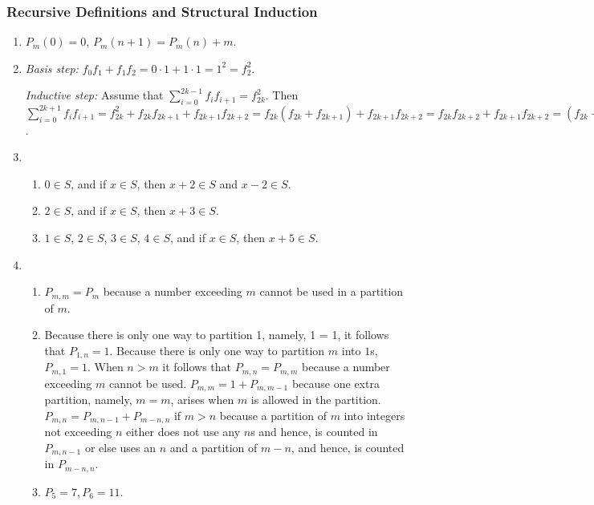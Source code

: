 \documentclass{../../cls/sig-alternate-05-2015}
\begin{document}
\subsubsection{Recursive Definitions and Structural Induction}
\begin{enumerate}
\item $P_m(0) = 0$, $P_m(n + 1) = P_m(n) + m$.
    
    
\item \textit{Basis step:} $f_0 f_1 + f_1 f_2 = 0 \cdot 1 + 1 \cdot 1 = 1^2 = f_2^2$.

\textit{Inductive step:} Assume that $\sum_{i = 0}^{2k - 1} f_i f_{i + 1} = f_{2k}^2$.
Then $\sum_{i = 0}^{2k + 1} f_i f_{i + 1} = f_{2k}^2 + f_{2k} f_{2k + 1} + f_{2k + 1} f_{2k + 2} = f_{2k} (f_{2k} + f_{2k + 1}) + f_{2k + 1} f_{2k + 2} = f_{2k} f_{2k + 2} + f_{2k + 1} f_{2k + 2} = (f_{2k} + f_{2k + 1}) f_{2k + 2} = f_{2k + 2}^2$.


\item
\begin{enumerate}
    \item $0 \in S$, and if $x \in S$, then $x + 2 \in S$
    and $x - 2 \in S$. 
    \item $2 \in S$, and if $x \in S$, then $x + 3 \in S$.
    \item $1 \in S$, $2 \in S$, $3 \in S$, $4 \in S$, and if $x \in S$, then $x + 5 \in S$.
\end{enumerate}


\item \begin{enumerate}
    \item $P_{m, m} = P_m$ because a number exceeding $m$ cannot be used in a partition of $m$.
    \item Because there is only one way to partition 1, namely, 1 = 1, it follows that $P_{1,n} = 1$.
    Because there is only one way to partition $m$ into $1$s, $P_{m,1} = 1$. When $n > m$ it follows that $P_{m, n} = P_{m, m}$ because a number exceeding $m$ cannot be used.
    $P_{m, m} = 1 + P_{m, m - 1}$ because one extra partition,
    namely, $m = m$,
    arises when $m$ is allowed in the partition.
    $P_{m, n} = P_{m, n - 1} + P_{m - n, n}$ if $m > n$ because a partition of $m$ into integers not exceeding $n$ either does not use any $n$s and hence,
    is counted in $P_{m, n - 1}$ or else uses an $n$ and a partition of $m - n$, and hence, is counted in $P_{m - n, n}$.
    \item $P_5 = 7, P_6 = 11$.
\end{enumerate}


\end{enumerate}
\end{document}
